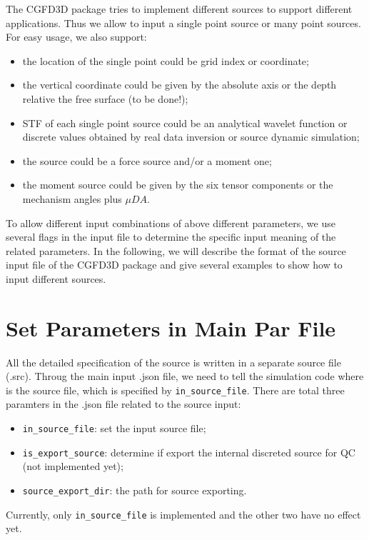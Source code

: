 The CGFD3D package tries to implement different sources to support different applications.
Thus we allow to input a single point source or many point sources.
For easy usage, we also support:
\begin{itemize}
    \item the location of the single point could be grid index or coordinate;
    \item the vertical coordinate could be given by the absolute axis or the depth relative the free surface (to be done!);
    \item STF of each single point source could be an analytical wavelet function or discrete values obtained by real data inversion or source dynamic simulation;
    \item the source could be a force source and/or a moment one;
    \item the  moment source could be given by the six tensor components or the mechanism angles plus $\mu DA$.
\end{itemize}


To allow different input combinations of above different parameters, 
we use several flags in the input file to determine the specific input meaning of the related parameters.
In the following, we will describe the format of the source input file of the CGFD3D package
 and give several examples to show how to input different sources.


\section{Set Parameters in Main Par File} \label{src_json}

All the detailed specification of the source is written in a separate source file (.src).
Throug the main input .json file, we need to tell the simulation code where is the source file,
which is specified by \verb|in_source_file|.
There are total three paramters in the .json file related to the source input:
\begin{itemize}
  \item \verb|in_source_file|: set the input source file;
  \item \verb|is_export_source|: determine if export the internal discreted source for QC (not implemented yet);
  \item \verb|source_export_dir|: the path for source exporting.
\end{itemize}
Currently, only \verb|in_source_file| is implemented and the other two have no effect yet.

